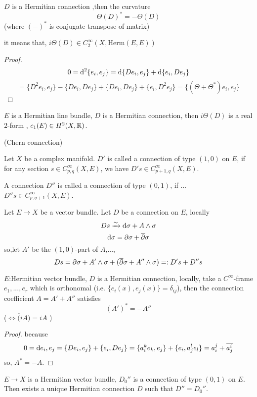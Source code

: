 \begin{prop}
$D$ is a Hermitian connection ,then the curvature
$$\Theta(D)^*=-\Theta(D)$$
(where $(-)^*$ is conjugate transpose of matrix)
\end{prop}

it means that, $i\Theta(D)\in C_2^\infty(X,\text{Herm}(E,E))$

\begin{proof}
$$0=\mathrm{d}^2\{e_i,e_j\}=\mathrm{d}\{De_i,e_j\}+\mathrm{d}\{e_i,De_j\}$$
$$=\{D^2e_i,e_j\}-\{De_i,De_j\}+\{De_i,De_j\}+\{e_i,D^2e_j\}=
\{(\Theta+\Theta^*)e_i,e_j\}$$
\end{proof}

\begin{rem}
$E$ is a Hermitian line bundle, $D$ is a Hermitian connection,
then $i\Theta(D)$ is a real $2$-form ,
$c_1(E)\in H^2(X,\mathbb{R})$.
\end{rem}

(Chern connection)

\begin{definition}Let $X$ be a complex manifold.
$D'$ is called a connection of type $(1,0)$ on $E$,
if for any section $s\in C_{p,q}^\infty(X,E)$, we have
$D's\in C_{p+1,q}^\infty(X,E)$.

A connection $D''$ is called a connection of type $(0,1)$, if ...
$D''s\in C_{p,q+1}^\infty(X,E)$.
\end{definition}

\begin{rem}Let $E\to X$ be a %
vector bundle.
Let $D$ be a connection on $E$, locally
$$Ds\xrightarrow{\sim}\mathrm{d}\sigma+A\wedge\sigma$$
$$\mathrm{d}\sigma=\partial\sigma+\overline{\partial}\sigma$$
so,let $A'$ be the $(1,0)$-part of $A$,...,
$$Ds=\partial\sigma+A'\wedge\sigma+(\overline{\partial}\sigma+A''\wedge\sigma)=:D's+D''s$$
\end{rem}

\begin{prop}
$E$:Hermitian vector bundle, $D$ is a Hermitian connection, locally,
take a $C^\infty$-frame $e_1,...,e_r$ which is orthonomal
(i.e. $\{e_i(x),e_j(x)\}=\delta_{ij}$), then the  connection coefficient
$A=A'+A''$ satisfies
$$(A')^*=-A''$$
($\iff \overline(iA)=iA$ )
\end{prop}

\begin{proof}
because
$$0=\mathrm{d}{e_i,e_j}=\{De_i,e_j\}+\{e_i,De_j\}
=\{a_i^ke_k,e_j\}+\{e_i,a_j^le_l\}
=a^j_i+\overline{a^i_j}$$
so, $A^*=-A$.
\end{proof}

\begin{cor}
$E\to X$ is a Hermitian vector bundle,
$D_0''$ is a connection of type $(0,1)$ on $E$.
Then exists a unique Hermitian connection $D$
such that $D''=D_0''$.
\end{cor}

